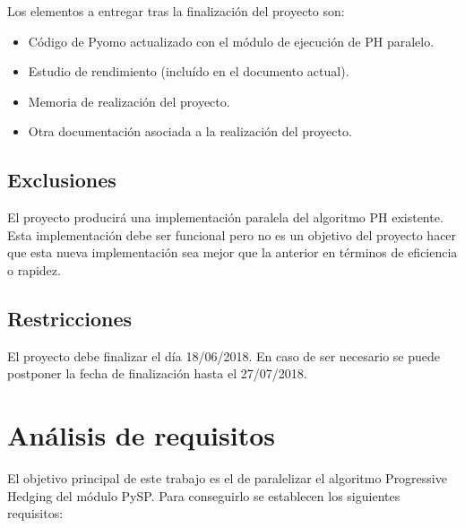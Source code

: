 Los elementos a entregar tras la finalización del proyecto son:

\begin{itemize}
    \item Código de Pyomo actualizado con el módulo de ejecución de PH paralelo.
    \item Estudio de rendimiento (incluído en el documento actual).
    \item Memoria de realización del proyecto.
    \item Otra documentación asociada a la realización del proyecto.
\end{itemize}

\subsection{Exclusiones}

El proyecto producirá una implementación paralela del algoritmo PH existente. Esta implementación debe ser funcional pero no es un objetivo del proyecto hacer que esta nueva implementación sea mejor que la anterior en términos de eficiencia o rapidez.

\subsection{Restricciones}

El proyecto debe finalizar el día 18/06/2018. En caso de ser necesario se puede postponer la fecha de finalización hasta el 27/07/2018.

\section{Análisis de requisitos}

El objetivo principal de este trabajo es el de paralelizar el algoritmo Progressive Hedging del módulo PySP. Para conseguirlo se establecen los siguientes requisitos:




